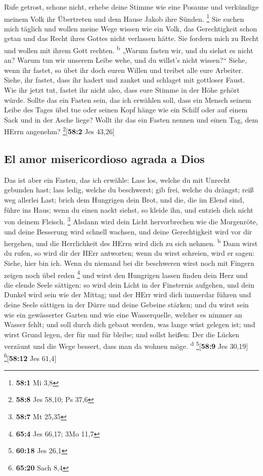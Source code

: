  Rufe getrost, schone nicht, erhebe deine Stimme wie eine
Posaune und verkündige meinem Volk ihr Übertreten und dem Hause Jakob
ihre Sünden. \footnote{\textbf{58:1} Mi 3,8}  Sie suchen
mich täglich und wollen meine Wege wissen wie ein Volk, das
Gerechtigkeit schon getan und das Recht ihres Gottes nicht verlassen
hätte. Sie fordern mich zu Recht und wollen mit ihrem Gott rechten.
\textsuperscript{b}  „Warum fasten wir, und du siehst es
nicht an? Warum tun wir unserem Leibe wehe, und du willst's nicht
wissen?{}`` Siehe, wenn ihr fastet, so übet ihr doch euren Willen und
treibet alle eure Arbeiter.  Siehe, ihr fastet, dass ihr
hadert und zanket und schlaget mit gottloser Faust. Wie ihr jetzt tut,
fastet ihr nicht also, dass eure Stimme in der Höhe gehört würde.
 Sollte das ein Fasten sein, das ich erwählen soll, dass
ein Mensch seinem Leibe des Tages übel tue oder seinen Kopf hänge wie
ein Schilf oder auf einem Sack und in der Asche liege? Wollt ihr das ein
Fasten nennen und einen Tag, dem HErrn angenehm?
\footnote{\textbf{58:8} Jes 58,10; Ps 37,6}{[}\textbf{58:2} Jes 43,26{]}

\hypertarget{el-amor-misericordioso-agrada-a-dios}{%
\subsection{El amor misericordioso agrada a
Dios}\label{el-amor-misericordioso-agrada-a-dios}}

 Das ist aber ein Fasten, das ich erwähle: Lass los,
welche du mit Unrecht gebunden hast; lass ledig, welche du beschwerst;
gib frei, welche du drängst; reiß weg allerlei Last; 
brich dem Hungrigen dein Brot, und die, die im Elend sind, führe ins
Haus; wenn du einen nackt siehst, so kleide ihn, und entzieh dich nicht
von deinem Fleisch. \footnote{\textbf{58:7} Mt 25,35} 
Alsdann wird dein Licht hervorbrechen wie die Morgenröte, und deine
Besserung wird schnell wachsen, und deine Gerechtigkeit wird vor dir
hergehen, und die Herrlichkeit des HErrn wird dich zu sich nehmen.
\textsuperscript{b}  Dann wirst du rufen, so wird dir der
HErr antworten; wenn du wirst schreien, wird er sagen: Siehe, hier bin
ich. Wenn du niemand bei dir beschweren wirst noch mit Fingern zeigen
noch übel reden \footnote{\textbf{65:4} Jes 66,17; 3Mo 11,7}
 und wirst den Hungrigen lassen finden dein Herz und die
elende Seele sättigen: so wird dein Licht in der Finsternis aufgehen,
und dein Dunkel wird sein wie der Mittag;  und der HErr
wird dich immerdar führen und deine Seele sättigen in der Dürre und
deine Gebeine stärken; und du wirst sein wie ein gewässerter Garten und
wie eine Wasserquelle, welcher es nimmer an Wasser fehlt;
 und soll durch dich gebaut werden, was lange wüst
gelegen ist; und wirst Grund legen, der für und für bleibe; und sollst
heißen: Der die Lücken verzäunt und die Wege bessert, dass man da wohnen
möge. \textsuperscript{d} \footnote{\textbf{60:18} Jes 26,1}{[}\textbf{58:9}
Jes 30,19{]} \footnote{\textbf{65:20} Sach 8,4}{[}\textbf{58:12} Jes
61,4{]}

